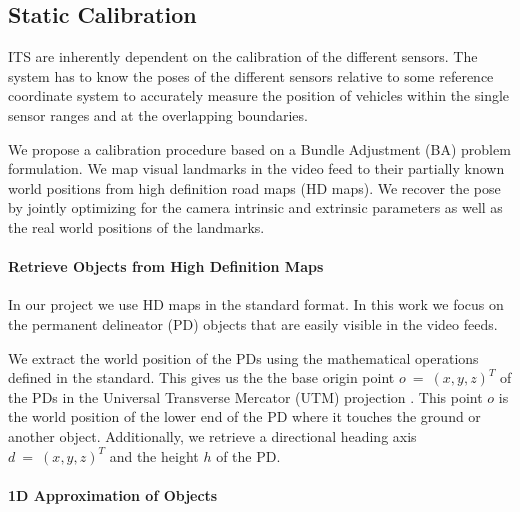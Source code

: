 
\subsection{Static Calibration}
\label{sec:static_calibration_approach}

ITS are inherently dependent on the calibration of the different sensors. 
The system has to know the poses of the different sensors relative to some reference coordinate system to accurately measure the position of vehicles within the single sensor ranges and at the overlapping boundaries.

We propose a calibration procedure based on a Bundle Adjustment (BA) problem formulation.
We map visual landmarks in the video feed to their partially known world positions from high definition road maps (HD maps).
We recover the pose by jointly optimizing for the camera intrinsic and extrinsic parameters as well as the real world positions of the landmarks. 


\paragraph{Retrieve Objects from High Definition Maps}

In our project we use HD maps in the \OD{} standard format.
In this work we focus on the permanent delineator (PD) objects that are easily visible in the video feeds.

We extract the world position of the PDs using the mathematical operations defined in the \OD{} standard.
This gives us the the base origin point $o~=~(x, y, z)^T$ of the PDs in the Universal Transverse Mercator (UTM) projection \cite{langley1998utm,proj}. 
This point $o$ is the world position of the lower end of the PD where it touches the ground or another object.
Additionally, we retrieve a directional heading axis $d~=~(x, y, z)^T$ and the height $h$ of the PD.

\paragraph{1D Approximation of Objects}

